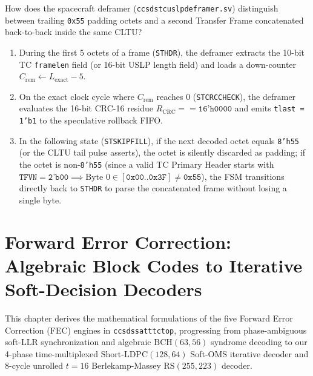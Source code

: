 \documentclass[10pt,a4paper]{article}
\renewcommand{\_}{\origunderscore\penalty0\hskip0pt\relax}
\numberwithin{equation}{section}
\numberwithin{table}{section}
\numberwithin{figure}{section}
\begin{document}
How does the spacecraft deframer (\texttt{ccsds\_tc\_uslp\_deframer.sv}) distinguish between trailing \texttt{0x55} padding octets and a second Transfer Frame concatenated back-to-back inside the same CLTU?
\begin{enumerate}\setlength{\itemsep}{2pt}
  \item During the first 5 octets of a frame (\texttt{ST\_HDR}), the deframer extracts the 10-bit TC \texttt{frame\_len} field (or 16-bit USLP length field) and loads a down-counter $C_{\text{rem}} \leftarrow L_{\text{exact}} - 5$.
  \item On the exact clock cycle where $C_{\text{rem}}$ reaches $0$ (\texttt{ST\_CRC\_CHECK}), the deframer evaluates the 16-bit CRC-16 residue $R_{\text{CRC}} == \texttt{16'h0000}$ and emits \texttt{tlast = 1'b1} to the speculative rollback FIFO.
  \item In the following state (\texttt{ST\_SKIP\_FILL}), if the next decoded octet equals \texttt{8'h55} (or the CLTU tail pulse asserts), the octet is silently discarded as padding; if the octet is non-\texttt{8'h55} (since a valid TC Primary Header starts with $\texttt{TFVN} = \texttt{2'b00} \implies \text{Byte }0 \in [\texttt{0x00}..\texttt{0x3F}] \ne \texttt{0x55}$), the FSM transitions directly back to \texttt{ST\_HDR} to parse the concatenated frame without losing a single byte.
\end{enumerate}

\vspace{6pt}
\section{Forward Error Correction: Algebraic Block Codes to Iterative Soft-Decision Decoders}

This chapter derives the mathematical formulations of the five Forward Error Correction (FEC) engines in \texttt{ccsds\_sat\_ttc\_top}, progressing from phase-ambiguous soft-LLR synchronization and algebraic $\text{BCH}(63,56)$ syndrome decoding to our 4-phase time-multiplexed $\text{Short-LDPC}(128,64)$ Soft-OMS iterative decoder and 8-cycle unrolled $t=16$ Berlekamp-Massey $\text{RS}(255,223)$ decoder.
\end{document}
